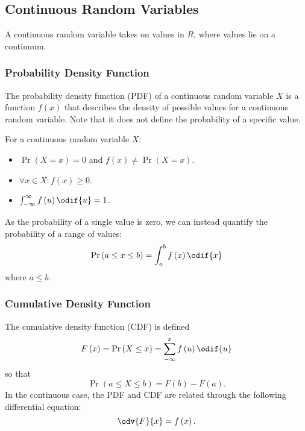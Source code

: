 \documentclass{article}
\begin{document}
\subsection{Continuous Random Variables}
\begin{definition}
    A continuous random variable takes on values in \(R\), where values lie on a continuum.
\end{definition}
\subsubsection{Probability Density Function}
The probability density function (PDF) of a continuous random variable \(X\) is a function \(f\left( x \right)\) that
describes the density of possible values for a continuous random variable. Note that it does not define the probability
of a specific value.

For a continuous random variable \(X\):
\begin{itemize}
    \item \(\Pr{\left( X = x \right)} = 0\) and \(f\left( x \right) \neq \Pr{\left( X = x \right)}\).
    \item \(\forall x \in X : f\left( x \right) \geq 0\).
    \item \(\int_{-\infty}^\infty f\left( u \right) \odif{u} = 1\).
\end{itemize}
As the probability of a single value is zero, we can instead quantify the probability of a range of values:
\begin{equation*}
    \Pr{\left( a \leq x \leq b \right)} = \int_{a}^{b} f\left( x \right) \odif{x}
\end{equation*}
where \(a \leq b\).
\subsubsection{Cumulative Density Function}
The cumulative density function (CDF) is defined
\begin{equation*}
    F\left( x \right) = \Pr{\left( X \leq x \right)} = \sum_{-\infty}^x f\left( u \right) \odif{u}
\end{equation*}
so that
\begin{equation*}
    \Pr{\left( a \leq X \leq b \right)} = F\left( b \right) - F\left( a \right).
\end{equation*}
In the continuous case, the PDF and CDF are related through the following differential equation:
\begin{equation*}
    \odv{F}{x} = f\left( x \right).
\end{equation*}
\end{document}
